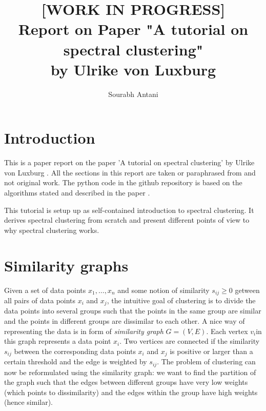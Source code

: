 \documentclass[10pt,a4paper, nocenter]{report}
\author{Sourabh Antani}
\title{[WORK IN PROGRESS] \\ Report on Paper "A tutorial on spectral clustering" \\by Ulrike von Luxburg}
\date{}
\begin{document}
	\maketitle
	\chapter{Introduction}
	\thispagestyle{fancy}
	This is a paper report on the paper 'A tutorial on spectral clustering' by Ulrike von Luxburg \cite{MainPaper}. All the sections in this report are taken or paraphrased from \cite{MainPaper} and not original work. The python code in the github repository\cite{github-repo} is based on the algorithms stated and described in the paper \cite{MainPaper}.
	
	This tutorial is setup up as self-contained introduction to spectral clustering. It derives spectral clustering from scratch and present different points of view to why spectral clustering works. 
	
	\chapter{Similarity graphs}
	\thispagestyle{fancy}
		Given a set of data points $x_{1},\dots,x_{n}$ and some notion of similarity $s_{ij}\ge 0$ getween all pairs of data points $x_{i}$ and $x_{j}$, the intuitive goal of clustering is to divide the data points into several groups such that the points in the same group are similar and the points in different groups are dissimilar to each other. A nice way of representing the data is in form of \textit{similarity graph} $G=(V,E)$. Each vertex $v_{i}$in this graph represents a data point $x_{i}$. Two vertices are connected if the similarity $s_{ij}$ between the corresponding data points $x_{i}$ and $x_{j}$ is positive or larger than a certain threshold and the edge is weighted by $s_{ij}$. The problem of clustering can now be reformulated using the similarity graph: we want to find the partition of the graph such that the edges between different groups have very low weights (which points to dissimilarity) and the edges within the group have high weights (hence similar). 
		\\
\end{document}
